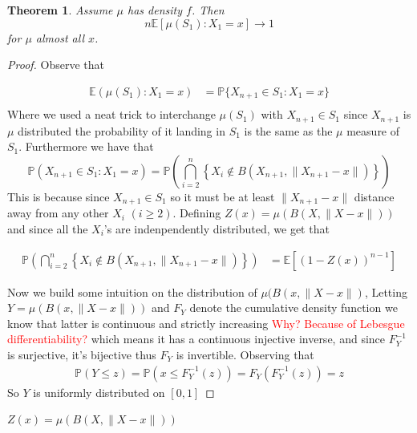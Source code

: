 \documentclass[12pt]{article}
\newtheorem{thm}{Theorem}
\theoremstyle{definition}
\theoremstyle{remark}
\begin{document}
\begin{thm}
	Assume $\mu$ has density $f$. Then 
	$$
		n \mathbb{E} [ \mu(S_1) \colon X_1 = x] \to 1
	$$
	for $\mu$ almost all $x$.
\end{thm}





\begin{proof}
	Observe that  

	\begin{align*}
		\mathbb{E}(\mu(S_1) \colon X_1 = x) &= \mathbb{P}\{X_{n+1} \in S_1 \colon X_1 = x\}\\
	\end{align*}
	Where we used a neat trick to interchange $\mu(S_1)$ with $ X_{n+1} \in S_1$ since $X_{n+1}$ is $\mu$ distributed the probability of it landing in $S_1$ is the same as the $\mu$ measure of $S_1$. 
	Furthermore we have that 
	$$
		\mathbb{P}(X_{n+1} \in S_1 \colon X_1 = x) = \mathbb{P}\left( \bigcap_{i=2}^n \left\{ X_i \notin B\left(X_{n+1}, \|X_{n+1}- x\|\right)\right\}\right)
	$$
	This is because since $X_{n+1} \in S_1$ so it must be at least $\|X_{n+1} - x\|$ distance away from any other $X_i$ $(i \geq 2)$. Defining $Z(x) = \mu(B(X,\|X-x\|))$ and since all the $X_i$'s are indenpendently distributed, we get that 

	\begin{align*}
		\mathbb{P}\left( \bigcap_{i=2}^n \left\{ X_i \notin B\left(X_{n+1}, \|X_{n+1}- x\|\right)\right\}\right) &= \mathbb{E}[(1-Z(x))^{n-1}]
	\end{align*}


	Now we build some intuition on the distribution of $\mu(B(x, \|X-x\|)$, Letting $Y = \mu(B(x,\|X-x\|))$ and $F_Y$ denote the cumulative density function we know that latter is continuous and strictly increasing  \textcolor{red}{Why? Because of Lebesgue differentiability?} which means it has a continuous injective inverse, and since $F_{Y}^{-1}$ is surjective, it's bijective thus $F_{Y}$ is invertible. Observing that
	\begin{align*}
		\mathbb{P}( Y \leq z) = \mathbb{P} ( x \leq F_Y^{-1}(z)) = F_Y(F^{-1}_Y (z)) = z
	\end{align*}
	So $Y$ is uniformly distributed on $[0,1]$


\end{proof}


$Z(x) = \mu(B(X,\|X-x\|))$








\end{document}
